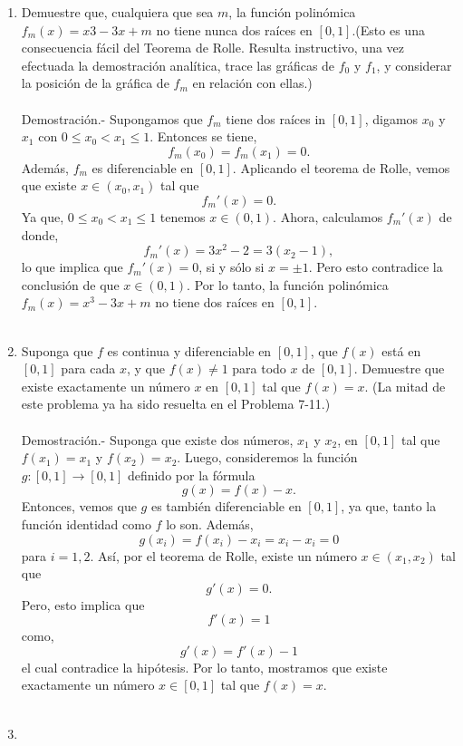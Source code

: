 \begin{enumerate}[\bfseries 1.]
    \item Demuestre que, cualquiera que sea $m$, la función polinómica $f_m(x) = x 3 - 3x + m$ no tiene nunca dos raíces en $[0, 1]$.(Esto es una consecuencia fácil del Teorema de Rolle. Resulta instructivo, una vez efectuada la demostración analítica, trace las gráficas de $f_0$ y $f_1$, y considerar la posición de la gráfica de $f_m$ en relación con ellas.)\\\\
	Demostración.-\; Supongamos que $f_m$ tiene dos raíces in $[0,1]$, digamos $x_0$ y $x_1$ con $0\leq x_0<x_1\leq 1$. Entonces se tiene,
	$$f_m(x_0)=f_m(x_1)=0.$$
	Además, $f_m$ es diferenciable en $[0,1]$. Aplicando el teorema de Rolle, vemos que existe $x\in(x_0,x_1)$ tal que
	$$f_m'(x)=0.$$
	Ya que, $0\leq x_0<x_1\leq 1$ tenemos $x\in(0,1)$. Ahora, calculamos $f_m'(x)$ de donde,
	$$f_m'(x)=3x^2-2=3\left(x_2-1\right),$$
	lo que implica que $f_m'(x)=0$, si y sólo si $x=\pm 1$. Pero esto contradice la conclusión de que $x\in (0,1)$. Por lo tanto, la función polinómica $f_m(x)=x^3-3x+m$ no tiene dos raíces en $[0,1]$.\\\\

    \item Suponga que $f$ es continua y diferenciable en $[0, 1]$, que $f(x)$ está en $[0, 1]$ para cada $x$, y que $f(x) \neq 1$ para todo $x$ de $[0, 1]$. Demuestre que existe exactamente un número $x$ en $[0,1]$ tal que $f(x) = x$. (La mitad de este problema ya ha sido resuelta en el Problema 7-11.)\\\\
	Demostración.-\; Suponga que existe dos números, $x_1$ y $x_2$, en $[0,1]$ tal que $f(x_1)=x_1$ y $f(x_2)=x_2$. Luego, consideremos la función $g:[0,1]\to [0,1]$ definido por la fórmula
	$$g(x)=f(x)-x.$$
	Entonces, vemos que $g$ es también diferenciable en $[0,1]$, ya que, tanto la función identidad como $f$ lo son. Además,
	$$g(x_i)=f(x_i)-x_i=x_i-x_i=0$$
	para $i=1,2$. Así, por el teorema de Rolle, existe un número $x\in(x_1,x_2)$ tal que
	$$g'(x)=0.$$
	Pero, esto implica que
	$$f'(x)=1$$
	como,
	$$g'(x)=f'(x)-1$$
	el cual contradice la hipótesis. Por lo tanto, mostramos que existe exactamente un número $x\in[0,1]$ tal que $f(x)=x.$\\\\

    \item 
	\begin{enumerate}[(a)]


\end{enumerate}
\end{enumerate}
